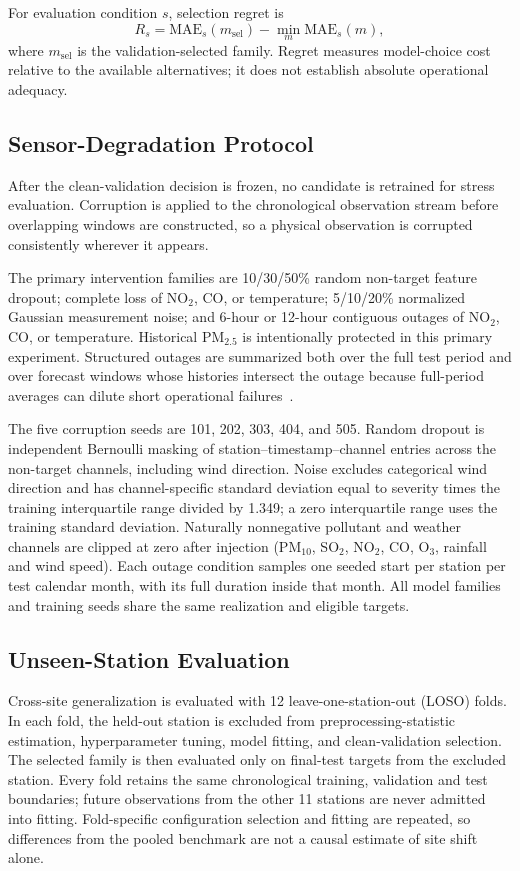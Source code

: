 \documentclass[journal]{IEEEtran}
\begin{document}
For evaluation condition $s$, selection regret is
\begin{equation}
R_s = \mathrm{MAE}_s(m_{\mathrm{sel}})-\min_m\mathrm{MAE}_s(m),
\end{equation}
where $m_{\mathrm{sel}}$ is the validation-selected family. Regret measures model-choice cost relative to the available alternatives; it does not establish absolute operational adequacy.

\subsection{Sensor-Degradation Protocol}
After the clean-validation decision is frozen, no candidate is retrained for stress evaluation. Corruption is applied to the chronological observation stream before overlapping windows are constructed, so a physical observation is corrupted consistently wherever it appears.

The primary intervention families are 10/30/50\% random non-target feature dropout; complete loss of NO$_2$, CO, or temperature; 5/10/20\% normalized Gaussian measurement noise; and 6-hour or 12-hour contiguous outages of NO$_2$, CO, or temperature. Historical PM$_{2.5}$ is intentionally protected in this primary experiment. Structured outages are summarized both over the full test period and over forecast windows whose histories intersect the outage because full-period averages can dilute short operational failures~\cite{alvaradoalcon2026citywide}.

The five corruption seeds are 101, 202, 303, 404, and 505. Random dropout is independent Bernoulli masking of station--timestamp--channel entries across the non-target channels, including wind direction. Noise excludes categorical wind direction and has channel-specific standard deviation equal to severity times the training interquartile range divided by 1.349; a zero interquartile range uses the training standard deviation. Naturally nonnegative pollutant and weather channels are clipped at zero after injection (PM$_{10}$, SO$_2$, NO$_2$, CO, O$_3$, rainfall and wind speed). Each outage condition samples one seeded start per station per test calendar month, with its full duration inside that month. All model families and training seeds share the same realization and eligible targets.

\subsection{Unseen-Station Evaluation}
Cross-site generalization is evaluated with 12 leave-one-station-out (LOSO) folds. In each fold, the held-out station is excluded from preprocessing-statistic estimation, hyperparameter tuning, model fitting, and clean-validation selection. The selected family is then evaluated only on final-test targets from the excluded station. Every fold retains the same chronological training, validation and test boundaries; future observations from the other 11 stations are never admitted into fitting. Fold-specific configuration selection and fitting are repeated, so differences from the pooled benchmark are not a causal estimate of site shift alone.
\end{document}
